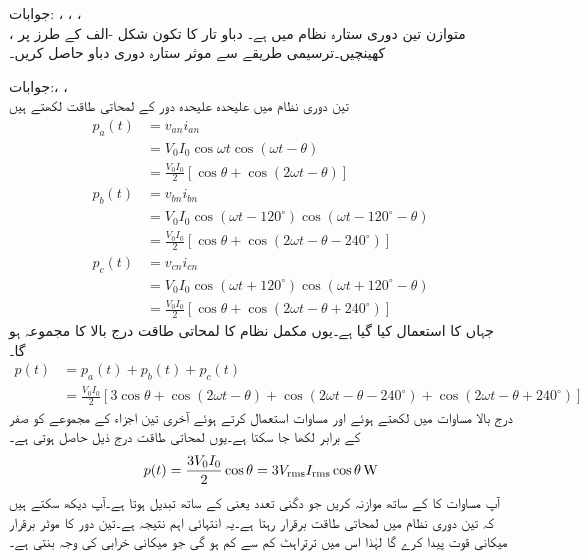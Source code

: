 جوابات: ، ، ، \\
، 
متوازن تین دوری  ستارہ نظام میں  ہے۔ دباو تار کا تکون شکل -الف کے طرز پر کھینچیں۔ترسیمی طریقے سے  موثر ستارہ دوری دباو حاصل کریں۔

جوابات:، ، \\ 
تین دوری نظام میں علیحدہ علیحدہ دور کے لمحاتی طاقت لکھتے ہیں 
\begin{align*}
p_a(t)&=v_{an}i_{an}\\
&=V_0 I_0 \cos \omega t \cos(\omega t -\theta)\\
&=\frac{V_0 I_0}{2}[\cos \theta +\cos(2\omega t -\theta)]\\
p_b(t)&=v_{bn}i_{bn}\\
&=V_0 I_0 \cos(\omega t -120^{\circ})\cos(\omega t-120^{\circ} -\theta)\\
&=\frac{V_0 I_0}{2}[\cos \theta +\cos(2\omega t -\theta-240^{\circ})]\\
p_c(t)&=v_{cn}i_{cn}\\
&=V_0 I_0 \cos (\omega t +120^{\circ})\cos(\omega t+120^{\circ} -\theta)\\
&=\frac{V_0 I_0}{2}[\cos \theta +\cos(2\omega t -\theta+240^{\circ})]
\end{align*}
جہاں  کا استعمال کیا گیا ہے۔یوں مکمل نظام کا لمحاتی طاقت  درج بالا کا مجموعہ ہو گا۔
\begin{align*}
p(t)&=p_a(t)+p_b(t)+p_c(t)\\
&=\frac{V_0 I_0}{2}[3\cos \theta +\cos(2\omega t-\theta)+\cos(2\omega t -\theta-240^{\circ})+\cos(2\omega t -\theta+240^{\circ})]
\end{align*}
درج بالا مساوات میں  لکھتے ہوئے اور مساوات  استعمال کرتے ہوئے آخری تین اجزاء کے مجموعے کو صفر کے برابر لکھا جا سکتا ہے۔یوں لمحاتی طاقت درج ذیل حاصل ہوتی ہے۔
\begin{align}\label{مساوات_تین_دوری_لمحاتی_طاقت_برقرار}
p(t)=\frac{3V_0 I_0}{2}\cos \theta =3 {V_{\textup{rms}}} {I_{\textup{rms}}} \cos \theta \,\si{\watt}
\end{align}
آپ مساوات  کا  کے ساتھ موازنہ کریں جو دگنی تعدد یعنی  کے ساتھ تبدیل ہوتا ہے۔آپ دیکھ سکتے ہیں کہ تین دوری نظام میں لمحاتی طاقت برقرار رہتا ہے۔یہ انتہائی اہم نتیجہ ہے۔تین دور کا موٹر برقرار میکانی قوت پیدا کرے گا لہٰذا اس میں ترتراہٹ کم سے کم ہو گی جو میکانی خرابی کی وجہ بنتی ہے۔

